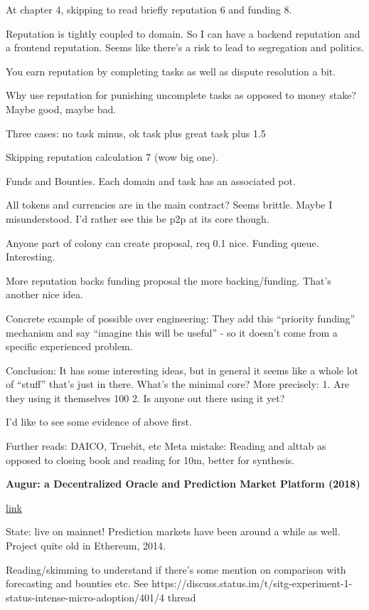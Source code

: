\documentclass[12pt]{report}
\newcommand{\link}[2]{\href{#1}{#2}}
\begin{document}
At chapter 4, skipping to read briefly reputation 6 and funding 8.

Reputation is tightly coupled to domain. So I can have a backend reputation and
a frontend reputation. Seems like there's a risk to lead to segregation and
politics.

You earn reputation by completing tasks as well as dispute resolution a bit.

Why use reputation for punishing uncomplete tasks as opposed to money stake?
Maybe good, maybe bad.

Three cases: no task minus, ok task plus great task plus 1.5

Skipping reputation calculation 7 (wow big one).

Funds and Bounties. Each domain and task has an associated pot.

All tokens and currencies are in the main contract? Seems brittle. Maybe I
misunderstood. I'd rather see this be p2p at its core though.

Anyone part of colony can create proposal, req 0.1%
nice. Funding queue. Interesting.

More reputation backs funding proposal the more backing/funding. That's another
nice idea.

Concrete example of possible over engineering: They add this ``priority funding'' mechanism and
say ``imagine this will be useful'' - so it doesn't come from a specific
experienced problem.

Conclusion: It has some interesting ideas, but in general it seems like a whole
lot of ``stuff'' that's just in there. What's the minimal core? More precisely:
1. Are they using it themselves 100%
2. Is anyone out there using it yet?

I'd like to see some evidence of above first.

Further reads: DAICO, Truebit, etc
Meta mistake: Reading and alttab as opposed to closing book and reading for 10m, better for synthesis.

\textbf{Augur: a Decentralized Oracle and Prediction Market Platform (2018)}

\link{https://github.com/AugurProject/whitepaper/blob/master/english/whitepaper.pdf}{link}

State: live on mainnet! Prediction markets have been around a while as well.
Project quite old in Ethereum, 2014.

Reading/skimming to understand if there's some mention on comparison with
forecasting and bounties etc. See
https://discuss.status.im/t/sitg-experiment-1-status-intense-micro-adoption/401/4
thread
\end{document}
